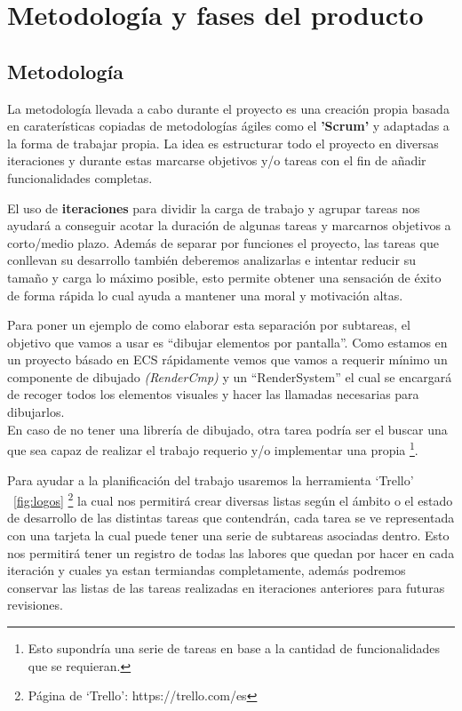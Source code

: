 \chapter{Metodología y fases del producto}
\label{metodologia}
\section{Metodología}
La metodología llevada a cabo durante el proyecto es una creación propia basada en caraterísticas
copiadas de metodologías ágiles como el \textbf{'Scrum'} y adaptadas a la forma de trabajar propia.
La idea es estructurar todo el proyecto en diversas iteraciones y durante estas marcarse
objetivos y/o tareas con el fin de añadir funcionalidades completas.

El uso de \textbf{iteraciones} para dividir la carga de trabajo y agrupar tareas nos ayudará
a conseguir acotar la duración de algunas tareas y marcarnos objetivos a corto/medio
plazo. Además de separar por funciones el proyecto, las tareas que conllevan su desarrollo
también deberemos analizarlas e intentar reducir su tamaño y carga lo máximo posible, esto
permite obtener una sensación de éxito de forma rápida lo cual ayuda a mantener una moral y 
motivación altas.

Para poner un ejemplo de como elaborar esta separación por subtareas, el objetivo que vamos a
usar es ``dibujar elementos por pantalla''. Como estamos en un proyecto básado en \ac{ECS} rápidamente
vemos que vamos a requerir mínimo un componente de dibujado \textit{(RenderCmp)} y un 
``RenderSystem'' el cual se encargará de recoger todos los elementos visuales y hacer las
llamadas necesarias para dibujarlos. \\
En caso de no tener una librería de dibujado, otra tarea podría ser el buscar una que sea capaz
de realizar el trabajo requerio y/o implementar una propia
\footnote{Esto supondría una serie de tareas en base a la cantidad de funcionalidades que se requieran.}. 

Para ayudar a la planificación del trabajo usaremos la herramienta `Trello'
~\ref{fig:logos} \footnote{Página de `Trello': https://trello.com/es}
la cual nos permitirá crear diversas listas según el ámbito o el estado de
desarrollo de las distintas tareas que contendrán, cada tarea se ve representada con
una tarjeta la cual puede tener una serie de subtareas asociadas dentro. Esto nos
permitirá tener un registro de todas las labores que quedan por hacer en cada iteración y
cuales ya estan termiandas completamente, además podremos conservar las listas de las tareas
realizadas en iteraciones anteriores para futuras revisiones.


